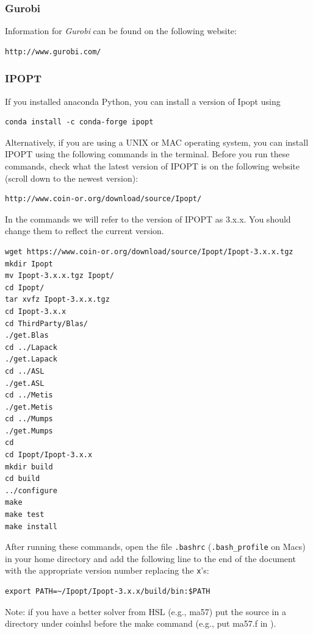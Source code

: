 \documentclass[11pt]{article}
\begin{document}
\subsubsection{Gurobi}
Information for \textit{Gurobi} can be found on the following website:
\begin{verbatim}
http://www.gurobi.com/
\end{verbatim}

\subsubsection{IPOPT}

If you installed anaconda Python, you can install a version of Ipopt using

\begin{verbatim}
conda install -c conda-forge ipopt 
\end{verbatim}

Alternatively, if you are using a UNIX or MAC operating system, you can install IPOPT using the following commands in the terminal. Before you run these commands, check what the latest version of IPOPT is on the following website (scroll down to the newest version):
\begin{verbatim}
http://www.coin-or.org/download/source/Ipopt/
\end{verbatim}
In the commands we will refer to the version of IPOPT as 3.x.x. You should change them to reflect the current version.
\begin{framed}
\begin{verbatim}
wget https://www.coin-or.org/download/source/Ipopt/Ipopt-3.x.x.tgz
mkdir Ipopt 
mv Ipopt-3.x.x.tgz Ipopt/
cd Ipopt/
tar xvfz Ipopt-3.x.x.tgz
cd Ipopt-3.x.x
cd ThirdParty/Blas/
./get.Blas
cd ../Lapack
./get.Lapack
cd ../ASL
./get.ASL
cd ../Metis
./get.Metis
cd ../Mumps
./get.Mumps
cd
cd Ipopt/Ipopt-3.x.x
mkdir build
cd build
../configure
make
make test
make install
\end{verbatim}
\end{framed}
After running these commands, open the file \texttt{.bashrc} (\texttt{.bash\_profile} on Macs) in your home directory and add the following line to the end of the document with the appropriate version number replacing the \texttt{x}'s:
\begin{verbatim}
export PATH=~/Ipopt/Ipopt-3.x.x/build/bin:$PATH
\end{verbatim}
Note: if you have a better solver from HSL (e.g., ma57) put the source in a
directory under coinhsl before the make command (e.g., put ma57.f in
).
\end{document}
